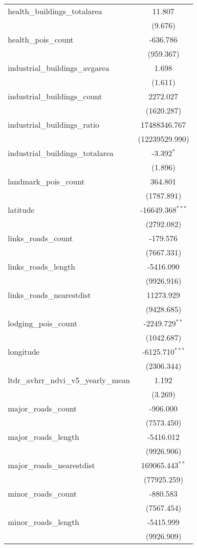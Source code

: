 \begin{table}[!htbp]
\begin{tabular}{@{\extracolsep{5pt}}lc}
 health_buildings_totalarea & 11.807$^{}$ \\
  & (9.676) \\
 health_pois_count & -636.786$^{}$ \\
  & (959.367) \\
 industrial_buildings_avgarea & 1.698$^{}$ \\
  & (1.611) \\
 industrial_buildings_count & 2272.027$^{}$ \\
  & (1620.287) \\
 industrial_buildings_ratio & 17488346.767$^{}$ \\
  & (12239529.990) \\
 industrial_buildings_totalarea & -3.392$^{*}$ \\
  & (1.896) \\
 landmark_pois_count & 364.801$^{}$ \\
  & (1787.891) \\
 latitude & -16649.368$^{***}$ \\
  & (2792.082) \\
 links_roads_count & -179.576$^{}$ \\
  & (7667.331) \\
 links_roads_length & -5416.090$^{}$ \\
  & (9926.916) \\
 links_roads_nearestdist & 11273.929$^{}$ \\
  & (9428.685) \\
 lodging_pois_count & -2249.729$^{**}$ \\
  & (1042.687) \\
 longitude & -6125.710$^{***}$ \\
  & (2306.344) \\
 ltdr_avhrr_ndvi_v5_yearly_mean & 1.192$^{}$ \\
  & (3.269) \\
 major_roads_count & -906.000$^{}$ \\
  & (7573.450) \\
 major_roads_length & -5416.012$^{}$ \\
  & (9926.906) \\
 major_roads_nearestdist & 169065.443$^{**}$ \\
  & (77925.259) \\
 minor_roads_count & -880.583$^{}$ \\
  & (7567.454) \\
 minor_roads_length & -5415.999$^{}$ \\
  & (9926.909) \\

\end{tabular}
\end{table}
